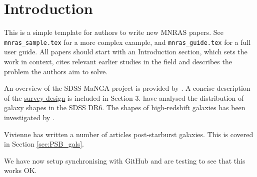 \section{Introduction}
\label{sec:introduction}

\par This is a simple template for authors to write new MNRAS papers.
See \texttt{mnras\_sample.tex} for a more complex example, and \texttt{mnras\_guide.tex}
for a full user guide. All papers should start with an Introduction section, which sets the work in context, cites relevant earlier studies in the field and describes the problem the authors aim to solve.

An overview of the SDSS MaNGA project is provided by \citet{Bundy_2014}. A concise description of the \href{https://iopscience.iop.org/article/10.1088/0004-637X/798/1/7/meta#apj504473s3}{survey design} is included in Section 3. \citet{2008MNRAS.388.1321P} have analysed the distribution of galaxy shapes in the SDSS DR6. The shapes of high-redshift galaxies has been investigated by \citet{2012ApJ...754L..24C}.

Vivienne has written a number of articles post-starburst galaxies. This is covered in Section \ref{sec:PSB_gals}.

We have now setup synchronising with GitHub and are testing to see that this works OK.
